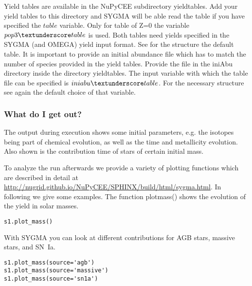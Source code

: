 Yield tables are available in the NuPyCEE subdirectory 
yield\textunderscore tables. Add your yield tables to
this directory and SYGMA will be able read the table
if you have specified the $table$ variable. Only
for table of Z=0 the variable $pop3\textunderscore table$ is used.
Both tables need yields specified in the SYGMA (and OMEGA)
yield input format. See for the structure the default table.
It is important to provide an initial abundance
file which has to match the number of species provided in the yield tables.
Provide the file in the iniAbu directory inside the directory yield\textunderscore tables.
The input variable with which the table file can be specified is $iniabu\textunderscore table$.
For the necessary structure see again the default choice of that variable.


\subsubsection{What do I get out?}


The output during execution shows some initial parameters,
e.g. the isotopes being part of chemical evolution,
as well as the time and metallicity evolution.
Also shown is the contribution time of stars of 
certain initial mass.




To analyze the run afterwards we provide a variety of plotting  functions
which are described in detail at \url{http://nugrid.github.io/NuPyCEE/SPHINX/build/html/sygma.html}.
In following we give some examples. The function plot\textunderscore mass() shows the evolution
of the yield in solar masses.


\begin{verbatim}
s1.plot_mass()
\end{verbatim}

With SYGMA you can look at different contributions
for AGB stars, massive stars, and SN~Ia.

\begin{verbatim}
s1.plot_mass(source='agb')
s1.plot_mass(source='massive')
s1.plot_mass(source='sn1a')

\end{verbatim}

